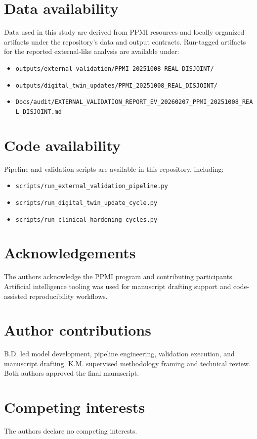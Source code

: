 \documentclass[pdflatex,sn-mathphys-num]{sn-jnl}
\begin{document}
\section*{Data availability}
Data used in this study are derived from PPMI resources and locally organized artifacts under the repository's data and output contracts. Run-tagged artifacts for the reported external-like analysis are available under:
\begin{itemize}
\item \texttt{outputs/external\_validation/PPMI\_20251008\_REAL\_DISJOINT/}
\item \texttt{outputs/digital\_twin\_updates/PPMI\_20251008\_REAL\_DISJOINT/}
\item \texttt{Docs/audit/EXTERNAL\_VALIDATION\_REPORT\_EV\_20260207\_PPMI\_20251008\_REAL\_DISJOINT.md}
\end{itemize}

\section*{Code availability}
Pipeline and validation scripts are available in this repository, including:
\begin{itemize}
\item \texttt{scripts/run\_external\_validation\_pipeline.py}
\item \texttt{scripts/run\_digital\_twin\_update\_cycle.py}
\item \texttt{scripts/run\_clinical\_hardening\_cycles.py}
\end{itemize}

\section*{Acknowledgements}
The authors acknowledge the PPMI program and contributing participants. Artificial intelligence tooling was used for manuscript drafting support and code-assisted reproducibility workflows.

\section*{Author contributions}
B.D. led model development, pipeline engineering, validation execution, and manuscript drafting. K.M. supervised methodology framing and technical review. Both authors approved the final manuscript.

\section*{Competing interests}
The authors declare no competing interests.
\end{document}
